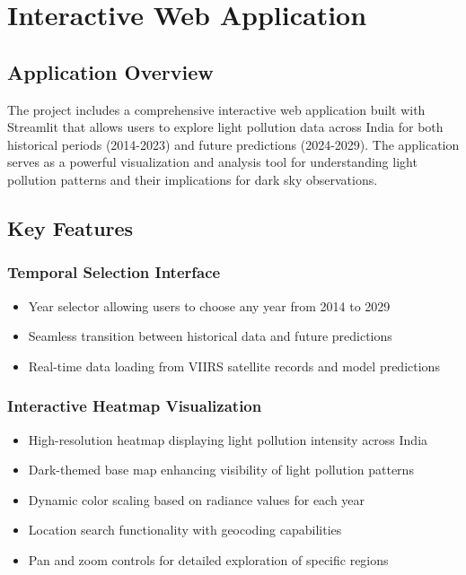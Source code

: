 \documentclass[12pt,a4paper]{article}
\begin{document}
\section{Interactive Web Application}

\subsection{Application Overview}
The project includes a comprehensive interactive web application built with Streamlit that allows users to explore light pollution data across India for both historical periods (2014-2023) and future predictions (2024-2029). The application serves as a powerful visualization and analysis tool for understanding light pollution patterns and their implications for dark sky observations.

\subsection{Key Features}

\subsubsection{Temporal Selection Interface}
\begin{itemize}
    \item Year selector allowing users to choose any year from 2014 to 2029
    \item Seamless transition between historical data and future predictions
    \item Real-time data loading from VIIRS satellite records and model predictions
\end{itemize}

\subsubsection{Interactive Heatmap Visualization}
\begin{itemize}
    \item High-resolution heatmap displaying light pollution intensity across India
    \item Dark-themed base map enhancing visibility of light pollution patterns
    \item Dynamic color scaling based on radiance values for each year
    \item Location search functionality with geocoding capabilities
    \item Pan and zoom controls for detailed exploration of specific regions
\end{itemize}
\end{document}
